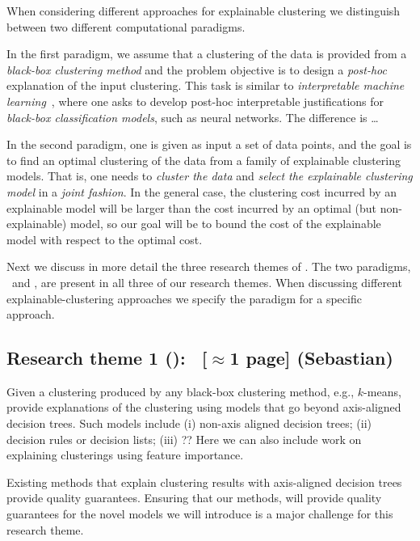 \documentclass[a4paper,11pt]{article}
\begin{document}
When considering different approaches for explainable clustering we distinguish between 
two different computational paradigms. 
\begin{description}
\setlength{\itemsep}{-2pt}
\item[\posthoc\,:]
In the first paradigm, we assume that a clustering of the data is provided 
from a \emph{black-box clustering method} and the problem objective is to design 
a \emph{post-hoc} explanation of the input clustering.
This task is similar to \emph{interpretable machine learning}~\cite{XXX}, 
where one asks to develop post-hoc interpretable justifications for 
\emph{black-box classification models}, such as neural networks. 
The difference is \ldots 
\item[\joint\,:]
In the second paradigm, one is given as input a set of data points, 
and the goal is to find an optimal clustering of the data
from a family of explainable clustering models.
That is, one needs to \emph{cluster the data} and \emph{select the explainable clustering model}
in a \emph{joint fashion}.
In the general case, the clustering cost incurred by an explainable model 
will be larger than the cost incurred by an optimal (but non-explainable) model, 
so our goal will be to bound the cost of the explainable model with respect to the optimal cost.
\end{description}

Next we discuss in more detail the three research themes of \acronym.
The two paradigms, \posthoc\ and \joint, are present in all three of our research themes.
When discussing different explainable-clustering approaches 
we specify the paradigm for a specific approach.

\subsection*{Research theme 1 (\rto): \newmodels\ {\color{orange}[$\approx$1 page]} {\color{teal}(Sebastian)}}

Given a clustering produced by any black-box clustering method, e.g., $k$-means,
provide explanations of the clustering using models that go beyond axis-aligned decision trees.
Such models include 
(i) non-axis aligned decision trees;
(ii) decision rules or decision lists;
(iii) ??
Here we can also include work on explaining clusterings using feature importance. 

Existing methods that explain clustering results with axis-aligned decision trees
provide quality guarantees.
Ensuring that our methods, will provide quality guarantees for the novel models
we will introduce is a major challenge for this research theme.
\end{document}
